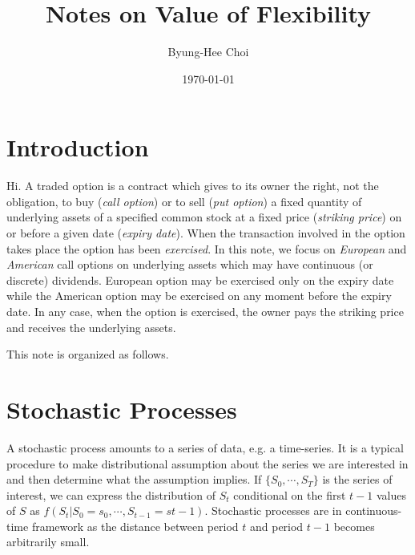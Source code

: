\documentclass[11pt,letter]{article}
\theoremstyle{definition}
\theoremstyle{remark}
\numberwithin{equation}{section}
\begin{document}
\title{Notes on Value of Flexibility}
\author{Byung-Hee Choi}%
\date{\today}%

\maketitle
\section{Introduction}

Hi. A traded option is a contract which gives to its owner the right, not the obligation, to buy (\textit{call option}) or to sell (\textit{put option}) a fixed quantity of underlying assets of a specified common stock at a fixed price (\textit{striking price}) on or before a given date (\textit{expiry date}). When the transaction involved in the option takes place the option has been \textit{exercised}. In this note, we focus on \textit{European} and \textit{American} call options on underlying assets which may have continuous (or discrete) dividends. European option may be exercised only on the expiry date while the American option may be exercised on any moment before the expiry date. In any case, when the option is exercised, the owner pays the striking price and receives the underlying assets.

This note is organized as follows. %


\section{Stochastic Processes}
A stochastic process amounts to a series of data, e.g. a time-series. It is a typical procedure to make distributional assumption about the series we are interested in and then determine what the assumption implies. If $\{S_0,\cdots,S_T\}$ is the series of interest, we can express the distribution of $S_t$ conditional on the first $t-1$ values of $S$ as $f(S_t|S_0=s_0,\cdots,S_{t-1}=s{t-1})$. Stochastic processes are in continuous-time framework as the distance between period $t$ and period $t-1$ becomes arbitrarily small.
\end{document}
